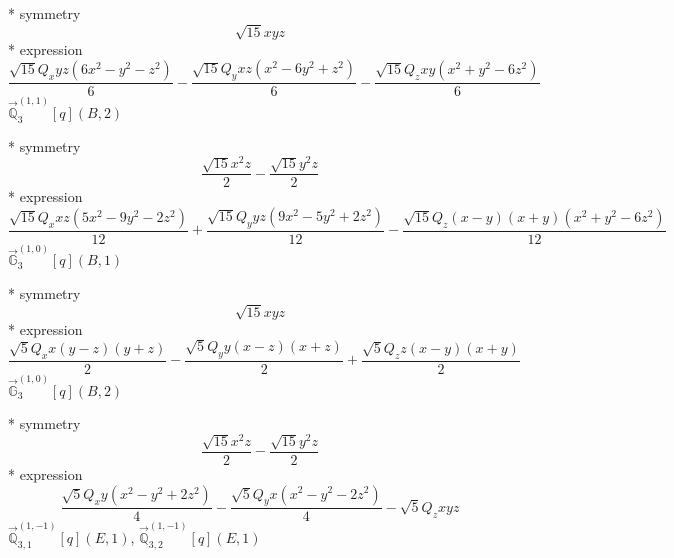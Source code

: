 \documentclass[fleqn,8pt]{jsarticle}
\begin{document}
\noindent\quad ** symmetry
\begin{dmath*}
\sqrt{15} x y z
\end{dmath*}
\noindent\quad ** expression
\begin{dmath*}
\frac{\sqrt{15} Q_{x} y z \left(6 x^{2} - y^{2} - z^{2}\right)}{6} - \frac{\sqrt{15} Q_{y} x z \left(x^{2} - 6 y^{2} + z^{2}\right)}{6} - \frac{\sqrt{15} Q_{z} x y \left(x^{2} + y^{2} - 6 z^{2}\right)}{6}
\end{dmath*}
\noindent\quad $\vec{\mathbb{Q}}_{3}^{(1,1)}[q](B,2)$

\noindent\quad ** symmetry
\begin{dmath*}
\frac{\sqrt{15} x^{2} z}{2} - \frac{\sqrt{15} y^{2} z}{2}
\end{dmath*}
\noindent\quad ** expression
\begin{dmath*}
\frac{\sqrt{15} Q_{x} x z \left(5 x^{2} - 9 y^{2} - 2 z^{2}\right)}{12} + \frac{\sqrt{15} Q_{y} y z \left(9 x^{2} - 5 y^{2} + 2 z^{2}\right)}{12} - \frac{\sqrt{15} Q_{z} \left(x - y\right) \left(x + y\right) \left(x^{2} + y^{2} - 6 z^{2}\right)}{12}
\end{dmath*}
\noindent\quad $\vec{\mathbb{G}}_{3}^{(1,0)}[q](B,1)$

\noindent\quad ** symmetry
\begin{dmath*}
\sqrt{15} x y z
\end{dmath*}
\noindent\quad ** expression
\begin{dmath*}
\frac{\sqrt{5} Q_{x} x \left(y - z\right) \left(y + z\right)}{2} - \frac{\sqrt{5} Q_{y} y \left(x - z\right) \left(x + z\right)}{2} + \frac{\sqrt{5} Q_{z} z \left(x - y\right) \left(x + y\right)}{2}
\end{dmath*}
\noindent\quad $\vec{\mathbb{G}}_{3}^{(1,0)}[q](B,2)$

\noindent\quad ** symmetry
\begin{dmath*}
\frac{\sqrt{15} x^{2} z}{2} - \frac{\sqrt{15} y^{2} z}{2}
\end{dmath*}
\noindent\quad ** expression
\begin{dmath*}
\frac{\sqrt{5} Q_{x} y \left(x^{2} - y^{2} + 2 z^{2}\right)}{4} - \frac{\sqrt{5} Q_{y} x \left(x^{2} - y^{2} - 2 z^{2}\right)}{4} - \sqrt{5} Q_{z} x y z
\end{dmath*}
\noindent\quad $\vec{\mathbb{Q}}_{3,1}^{(1,-1)}[q](E,1)$, $\vec{\mathbb{Q}}_{3,2}^{(1,-1)}[q](E,1)$
\end{document}
